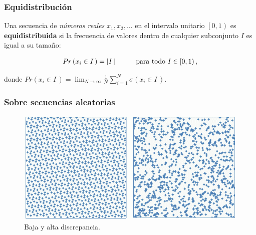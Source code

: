 \documentclass[t, 10pt, mathserif]{beamer}
\begin{document}

\begin{frame}
  \frametitle{Equidistribución}

  \begin{definition}
    Una secuencia de \textit{números reales} $x_1, x_2, \dots$ en el intervalo unitario $\left[0, 1\right)$ es \textbf{equidistribuida} si la frecuencia de valores dentro de cualquier subconjunto $I$ es igual a su tamaño:
    \pause

    \begin{equation*}
      \begin{aligned}
        Pr \left( x_i \in I\, \right) = \left| I\, \right| \hspace*{1cm} \text{para todo } I \in \left[0, 1\right) \text{,}
      \end{aligned}
    \end{equation*}

    donde $Pr \left( x_i \in I\, \right) = \lim_{N \to \infty} \frac{1}{N} \sum_{i = 1}^{N} \sigma(x_i \in I\,)$.
  \end{definition}

\end{frame}


\begin{frame}
  \frametitle{Sobre secuencias aleatorias}

  \begin{figure}
    \includegraphics[width=\textwidth]{resources/discrepancia.png}
    \caption{Baja y alta discrepancia.}
  \end{figure}
\end{frame}
 
\end{document}
